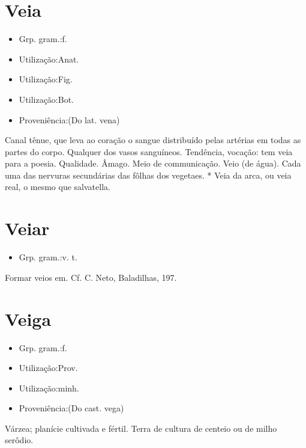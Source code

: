 \documentclass{article}
\begin{document}
\section{Veia}
\begin{itemize}
\item {Grp. gram.:f.}
\end{itemize}
\begin{itemize}
\item {Utilização:Anat.}
\end{itemize}
\begin{itemize}
\item {Utilização:Fig.}
\end{itemize}
\begin{itemize}
\item {Utilização:Bot.}
\end{itemize}
\begin{itemize}
\item {Proveniência:(Do lat. \textunderscore vena\textunderscore )}
\end{itemize}
Canal tênue, que leva ao coração o sangue distribuído pelas artérias em todas as partes do corpo.
Qualquer dos vasos sanguíneos.
Tendência, vocação: \textunderscore tem veia para a poesia\textunderscore .
Qualidade.
Âmago.
Meio de communicação.
Veio (de água).
Cada uma das nervuras secundárias das fôlhas dos vegetaes.
* \textunderscore Veia da arca\textunderscore , ou \textunderscore veia real\textunderscore , o mesmo que \textunderscore salvatella\textunderscore .
\section{Veiar}
\begin{itemize}
\item {Grp. gram.:v. t.}
\end{itemize}
Formar veios em. Cf. C. Neto, \textunderscore Baladilhas\textunderscore , 197.
\section{Veiga}
\begin{itemize}
\item {Grp. gram.:f.}
\end{itemize}
\begin{itemize}
\item {Utilização:Prov.}
\end{itemize}
\begin{itemize}
\item {Utilização:minh.}
\end{itemize}
\begin{itemize}
\item {Proveniência:(Do cast. \textunderscore vega\textunderscore )}
\end{itemize}
Várzea; planície cultivada e fértil.
Terra de cultura de centeio ou de milho serôdio.
\end{document}
